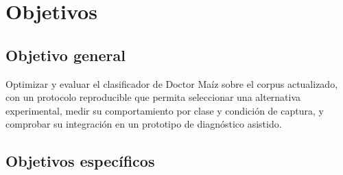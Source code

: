 \section{Objetivos}

\subsection{Objetivo general}

Optimizar y evaluar el clasificador de Doctor Maíz sobre el corpus actualizado,
con un protocolo reproducible que permita seleccionar una alternativa
experimental, medir su comportamiento por clase y condición de captura, y
comprobar su integración en un prototipo de diagnóstico asistido.

\subsection{Objetivos específicos}


